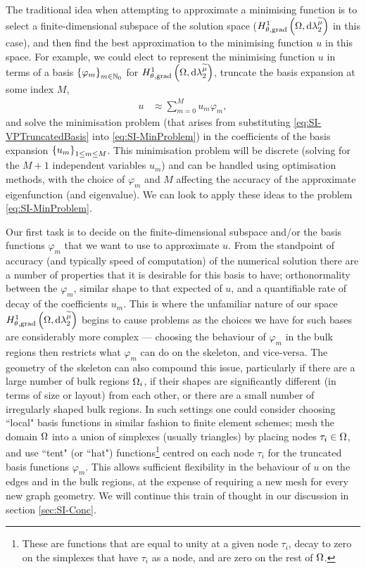 The traditional idea when attempting to approximate a minimising function is to select a finite-dimensional subspace of the solution space ($H^1_{\theta, \mathrm{grad}}\left( \Omega, \mathrm{d}\lambda_2^{\widetilde{\mu}} \right)$ in this case), and then find the best approximation to the minimising function $u$ in this space.
For example, we could elect to represent the minimising function $u$ in terms of a basis $\left\{ \varphi_m \right\}_{m\in\mathbb{N}_0}$ for $H^1_{\theta, \mathrm{grad}}\left( \Omega, \mathrm{d}\lambda_2^{\widetilde{\mu}} \right)$, truncate the basis expansion at some index $M$,
\begin{align} \label{eq:SI-VPTruncatedBasis}
	u &\approx \sum_{m=0}^M u_m \varphi_m,
\end{align}
and solve the minimisation problem (that arises from substituting \eqref{eq:SI-VPTruncatedBasis} into \eqref{eq:SI-MinProblem}) in the coefficients of the basis expansion $\left\{ u_m \right\}_{1\leq m\leq M}$.
This minimisation problem will be discrete (solving for the $M+1$ independent variables $u_m$) and can be handled using optimisation methods, with the choice of $\varphi_m$ and $M$ affecting the accuracy of the approximate eigenfunction (and eigenvalue).
We can look to apply these ideas to the problem \eqref{eq:SI-MinProblem}.

Our first task is to decide on the finite-dimensional subspace and/or the basis functions $\varphi_m$ that we want to use to approximate $u$.
From the standpoint of accuracy (and typically speed of computation) of the numerical solution there are a number of properties that it is desirable for this basis to have; orthonormality between the $\varphi_m$, similar shape to that expected of $u$, and a quantifiable rate of decay of the coefficients $u_m$.
This is where the unfamiliar nature of our space $H^1_{\theta, \mathrm{grad}}\left( \Omega, \mathrm{d}\lambda_2^{\widetilde{\mu}} \right)$ begins to cause problems as the choices we have for such bases are considerably more complex --- choosing the behaviour of $\varphi_m$ in the bulk regions then restricts what $\varphi_m$ can do on the skeleton, and vice-versa. 
The geometry of the skeleton can also compound this issue, particularly if there are a large number of bulk regions $\Omega_i$, if their shapes are significantly different (in terms of size or layout) from each other, or there are a small number of irregularly shaped bulk regions.
In such settings one could consider choosing ``local" basis functions in similar fashion to finite element schemes; mesh the domain $\Omega$ into a union of simplexes (usually triangles) by placing nodes $\tau_i\in\Omega$, and use ``tent" (or ``hat") functions\footnote{These are functions that are equal to unity at a given node $\tau_i$, decay to zero on the simplexes that have $\tau_i$ as a node, and are zero on the rest of $\Omega$.} centred on each node $\tau_i$ for the truncated basis functions $\varphi_m$.
This allows sufficient flexibility in the behaviour of $u$ on the edges and in the bulk regions, at the expense of requiring a new mesh for every new graph geometry.
We will continue this train of thought in our discussion in section \ref{sec:SI-Conc}.

